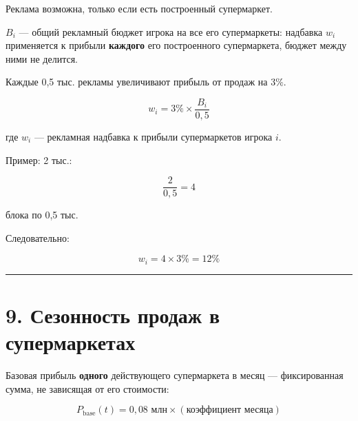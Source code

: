\documentclass[
]{article}
\begin{document}
Реклама возможна, только если есть построенный супермаркет.

\(B_i\) --- общий рекламный бюджет игрока на все его супермаркеты:
надбавка \(w_i\) применяется к прибыли \textbf{каждого} его построенного
супермаркета, бюджет между ними не делится.

Каждые 0,5 тыс. рекламы увеличивают прибыль от продаж на \(3\%\).

\[
w_i
=
3\%
\times
\frac{B_i}{0{,}5}
\]

где \(w_i\) --- рекламная надбавка к прибыли супермаркетов игрока \(i\).

Пример: 2 тыс.:

\[
\frac{2}{0{,}5}
=
4
\]

блока по 0,5 тыс.

Следовательно:

\[
w_i
=
4 \times 3\%
=
12\%
\]

\begin{center}\rule{0.5\linewidth}{0.5pt}\end{center}

\section{9. Сезонность продаж в
супермаркетах}\label{ux441ux435ux437ux43eux43dux43dux43eux441ux442ux44c-ux43fux440ux43eux434ux430ux436-ux432-ux441ux443ux43fux435ux440ux43cux430ux440ux43aux435ux442ux430ux445}

Базовая прибыль \textbf{одного} действующего супермаркета в месяц ---
фиксированная сумма, не зависящая от его стоимости:

\[
P_{\text{base}}(t)
=
0{,}08\text{ млн}
\times
(\text{коэффициент месяца})
\]
\end{document}
